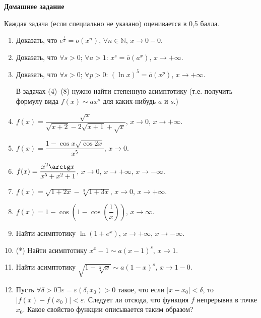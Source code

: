 \documentclass[12pt]{article}
\begin{document}
	\begin{center}
		\large\bf Домашнее задание 
	\end{center}
	Каждая задача (если специально не указано) оценивается в 0,5 балла.\medskip
	
	\begin{enumerate}
		\item Доказать, что $e^{\frac{1}{x}} = \overline{o}\left(x^n\right)$, $\forall n \in \mathbb{N}$, $x \rightarrow 0 - 0$.
		\item Доказать, что $\forall s > 0$; $\forall a > 1$: $x^s = \overline{o}\left(a^x\right)$, $x \rightarrow + \infty$.
		\item Доказать, что $\forall s > 0$; $\forall p > 0$: $\left(\ln x\right)^5 = \overline{o}\left(x^p\right)$, $x \rightarrow + \infty$.\bigskip
		
		В задачах (4)--(8) нужно найти степенную асимптотику (т.е. получить формулу вида $f(x)\sim ax^s$ для каких-нибудь $a$ и $s$.)
		
		\item $f(x) = \dfrac{\sqrt{x}}{\sqrt{x + 2} - 2\sqrt{x + 1} + \sqrt{x}}$, $x \rightarrow 0$, $x \rightarrow + \infty$.
		\item $f(x) = \dfrac{1 - \cos x \sqrt{\cos 2x}}{x^5}$, $x \rightarrow 0$.
		\item $f(x) = \dfrac{x^2 \arctg x}{x^5 + x^2 + 1}$, $x \rightarrow 0$, $x \rightarrow + \infty$, $x \rightarrow - \infty$.
		\item $f(x) = \sqrt{1 + 2x} - \sqrt[3]{1 + 3x}$, $x \rightarrow 0$, $x \rightarrow + \infty$.
		\item $f(x) = 1 - \cos \left(1 - \cos \left(\dfrac{1}{x}\right)\right)$, $x \rightarrow \infty$.
		\item Найти асимптотику $\ln (1 + e^x)$, $x \rightarrow + \infty$, $x \rightarrow - \infty$.
		
		\item (*) Найти асимптотику $x^x-1\sim a(x-1)^s$, $x \rightarrow 1$.
		
		\item Найти асимптотику $\sqrt{1-\sqrt[3]{x}}\sim a(1-x)^s$, $x \rightarrow 1-0$.
		
		\item Пусть $\forall\delta>0$\quad $\exists\varepsilon=\varepsilon(\delta,x_0)>0$ такое, что если $|x-x_0|<\delta$, то $|f(x)-f(x_0)|<\varepsilon$. Следует ли отсюда, что функция $f$ непрерывна в точке $x_0$. Какое свойство функции описывается таким образом?
		

\end{enumerate}
\end{document}
